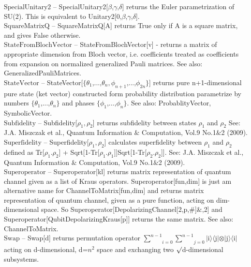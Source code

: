 \documentclass[a4paper,10pt]{scrartcl}
\begin{document}
\textbf{$ \text{SpecialUnitary2} $ }-- SpecialUnitary2[$\beta $,$\gamma $,$\delta $] returns the Euler parametrization of SU(2). This is equivalent to Unitary2[0,$\beta $,$\gamma $,$\delta $].$  $\\

\textbf{$ \text{SquareMatrixQ} $ }-- SquareMatrixQ[A] returns True only if A is a square matrix, and gives False otherwise.$  $\\

\textbf{$ \text{StateFromBlochVector} $ }-- StateFromBlochVector[v] - returns a matrix of appropriate dimension from Bloch vector, i.e. coefficients treated as coefficients from expansion on normalized generalized Pauli matrices. See also: GeneralizedPauliMatrices.$  $\\

\textbf{$ \text{StateVector} $ }-- StateVector[$\{$$ \theta _1 $,...,$ \theta _n,\phi _{n+1} $,...,$ \phi _{2 n} $$\}$] returns pure n+1-dimensional pure state (ket vector) constructed form probability distribution parametrize by numbers $\{$$ \theta _1 $,...,$ \theta _n $$\}$ and phases $\{$$ \phi _1 $,...,$ \phi _n $$\}$. See also: ProbablityVector, SymbolicVector.$  $\\

\textbf{$ \text{Subfidelity} $ }-- Subfidelity[$ \rho _1,\rho _2 $] returns subfidelity between states $ \rho _1 $ and $ \rho _2 $ See: J.A. Miszczak et al., Quantum Information $\&$ Computation, Vol.9 No.1$\&$2 (2009).$  $\\

\textbf{$ \text{Superfidelity} $ }-- Superfidelity[$ \rho _1,\rho _2 $] calculates superfidelity between $ \rho _1 $ and $ \rho _2 $ defined as Tr[$ \rho _1.\rho _2 $] + Sqrt[1-Tr[$ \rho _1.\rho _1 $]]Sqrt[1-Tr[$ \rho _2.\rho _2 $]]. See: J.A. Miszczak et al., Quantum Information $\&$ Computation, Vol.9 No.1$\&$2 (2009).$  $\\

\textbf{$ \text{Superoperator} $ }-- Superoperator[kl] returns matrix representation of quantum channel given as a list of Kraus operators. Superoperator[fun,dim] is just am alternative name for ChannelToMatrix[fun,dim] and returns matrix representation of quantum channel, given as a pure function, acting on dim-dimensional space. So Superoperator[DepolarizingChannel[2,p,$\#$]$\&$,2] and Superoperator[QubitDepolarizingKraus[p]] returns the same matrix. See also: ChannelToMatrix.$  $\\

\textbf{$ \text{Swap} $ }-- Swap[d] returns permutation operator $ \underset{i=0}{\overset{n-1}{ \sum }}\underset{j=0}{\overset{n-1}{ \sum }} $$|$i$\rangle \langle $j$|\otimes |$j$\rangle \langle $i$|$ acting on d-dimensional, d=$ n^2 $ space and exchanging two $\surd $d-dimensional subsystems.$  $\\
\end{document}
